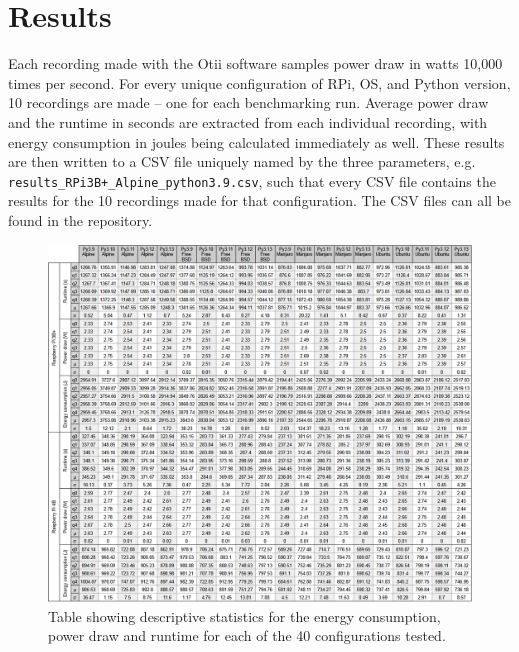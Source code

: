 \section{Results}
\label{sec:results}

Each recording made with the Otii software samples power draw in watts 10,000 times per second. For every unique configuration of RPi, OS, and Python version, 10 recordings are made -- one for each benchmarking run. Average power draw and the runtime in seconds are extracted from each individual recording, with energy consumption in joules being calculated immediately as well. These results are then written to a CSV file uniquely named by the three parameters, e.g. \texttt{results\_RPi3B+\_Alpine\_python3.9.csv}, such that every CSV file contains the results for the 10 recordings made for that configuration. The CSV files can all be found in the repository.  

\begin{figure}[H]
    \centering
    \includegraphics[width=1\textwidth]{figures/summary_stats_all.PNG}
    \caption{Table showing descriptive statistics for the energy consumption, power draw and runtime for each of the 40 configurations tested.}
    \label{fig:statstable}
\end{figure}


